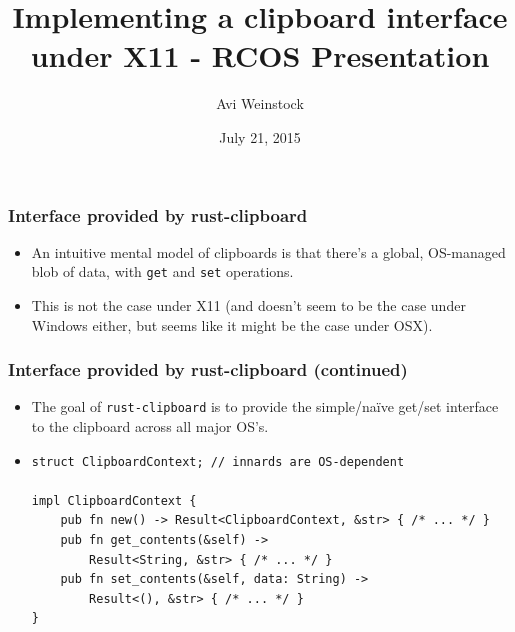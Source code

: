 \documentclass{beamer}
\title{Implementing a clipboard interface under X11 - RCOS Presentation}
\date{July 21, 2015}
\author{Avi Weinstock}
\begin{document}
\maketitle

%

\begin{frame}[fragile]
\frametitle{Interface provided by rust-clipboard}
\begin{itemize}
\item
An intuitive mental model of clipboards is that there's a global, OS-managed blob of data, with \verb|get| and \verb|set| operations.
\item
This is not the case under X11 (and doesn't seem to be the case under Windows either, but seems like it might be the case under OSX).
\end{itemize}
\end{frame}

\begin{frame}[fragile]
\frametitle{Interface provided by rust-clipboard (continued)}
\begin{itemize}
\item
The goal of \verb|rust-clipboard| is to provide the simple/na\"ive get/set interface to the clipboard across all major OS's.
\item
\begin{Verbatim}[frame=single, fontsize=\scriptsize]
struct ClipboardContext; // innards are OS-dependent

impl ClipboardContext {
    pub fn new() -> Result<ClipboardContext, &str> { /* ... */ }
    pub fn get_contents(&self) ->
        Result<String, &str> { /* ... */ }
    pub fn set_contents(&self, data: String) ->
        Result<(), &str> { /* ... */ }
}
\end{Verbatim}
\end{itemize}
\end{frame}
\end{document}
